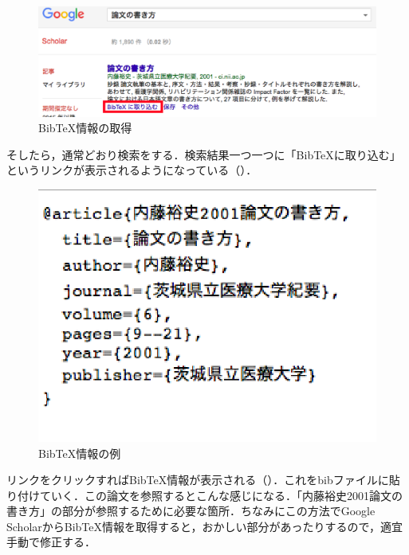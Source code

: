 \begin{figure}[h]
	\begin{center}
		\includegraphics[width=\linewidth]{img/search.eps}
		\caption{BibTeX情報の取得}
		\label{fig:search}
	\end{center}
\end{figure}


そしたら，通常どおり検索をする．検索結果一つ一つに「BibTeXに取り込む」というリンクが表示されるようになっている（）．


\begin{figure}[h]
	\begin{center}
		\includegraphics[width=0.5\linewidth]{img/result.eps}
		\caption{BibTeX情報の例}
		\label{fig:result}
	\end{center}
\end{figure}


リンクをクリックすればBibTeX情報が表示される（）．これをbibファイルに貼り付けていく．この論文を参照するとこんな感じになる\cite{内藤裕史2001論文の書き方}．「内藤裕史2001論文の書き方」の部分が参照するために必要な箇所．ちなみにこの方法でGoogle ScholarからBibTeX情報を取得すると，おかしい部分があったりするので，適宜手動で修正する．